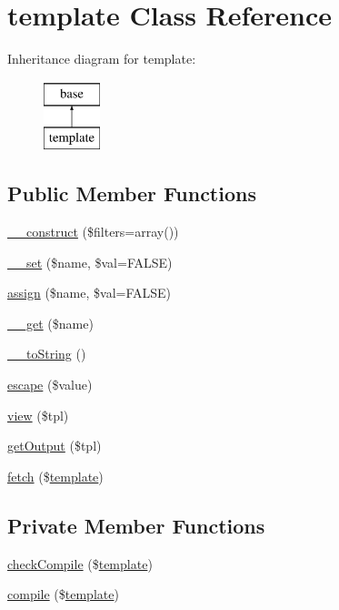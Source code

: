 \hypertarget{classtemplate}{
\section{template Class Reference}
\label{classtemplate}
}
Inheritance diagram for template:\begin{figure}[H]
\begin{center}
\leavevmode
\includegraphics[height=2.000000cm]{classtemplate}
\end{center}
\end{figure}
\subsection*{Public Member Functions}
\begin{DoxyCompactItemize}
\item 
\hyperlink{classtemplate_a4821f033c4fe016ba44abdb9a538e1e1}{\_\-\_\-construct} (\$filters=array())
\item 
\hyperlink{classtemplate_a1824d17809af80aebc2ae9cfc5feb6e5}{\_\-\_\-set} (\$name, \$val=FALSE)
\item 
\hyperlink{classtemplate_a126f8ff7a76ad8f438ec613ee4458760}{assign} (\$name, \$val=FALSE)
\item 
\hyperlink{classtemplate_abc8e9e31bb15c8a44c3210ec551407c8}{\_\-\_\-get} (\$name)
\item 
\hyperlink{classtemplate_a7516ca30af0db3cdbf9a7739b48ce91d}{\_\-\_\-toString} ()
\item 
\hyperlink{classtemplate_a285bd081242bd934973261fa6b2ccdc2}{escape} (\$value)
\item 
\hyperlink{classtemplate_ada2685086f0dc2eb8099c94f7d074885}{view} (\$tpl)
\item 
\hyperlink{classtemplate_aa3b95c953fadf314c73253c5e029aecf}{getOutput} (\$tpl)
\item 
\hyperlink{classtemplate_a69b8a525840eb80f0e5a1df9cd22b04c}{fetch} (\$\hyperlink{classtemplate}{template})
\end{DoxyCompactItemize}
\subsection*{Private Member Functions}
\begin{DoxyCompactItemize}
\item 
\hyperlink{classtemplate_a57fe1e92cfb84c13658d12becd326984}{checkCompile} (\$\hyperlink{classtemplate}{template})
\item 
\hyperlink{classtemplate_ab0a641d23ff3291dc8a94085f06b5dee}{compile} (\$\hyperlink{classtemplate}{template})
\end{DoxyCompactItemize}
